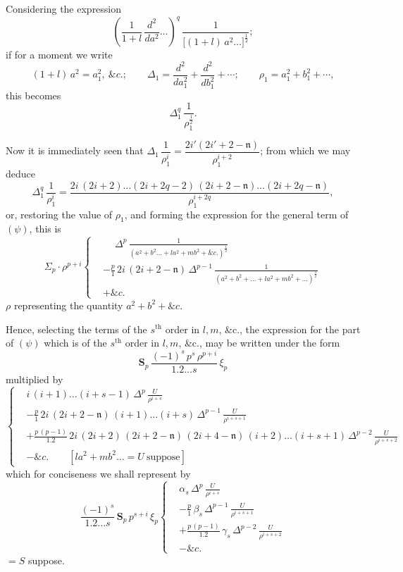 \documentclass[11pt]{article}
\begin{document}
\bigskip

Considering the expression
\[
\left(\frac{1}{1+l}\,\frac{d^2}{da^2}\ldots\right)^{q}\,\frac{1}{\bigl[(1+l)\,a^2 \ldots\bigr]^{\frac{1}{2}}};
\]
if for a moment we write
\[
(1+l)\,a^2 = a_1^2,\ \&c.;\qquad \Delta_1 = \frac{d^2}{da_1^2} + \frac{d^2}{db_1^2} + \cdots;\qquad \rho_1 = a_1^2 + b_1^2 + \cdots,
\]
this becomes
\[
\Delta_1^{q}\,\frac{1}{\rho_1^{\frac{1}{2}}}.
\]

Now it is immediately seen that $\Delta_1\,\dfrac{1}{\rho_1^{i}} = \dfrac{2i'(2i' + 2 - \mathfrak{n})}{\rho_1^{i+2}}$;
from which we may deduce
\[
\Delta_1^{q}\,\frac{1}{\rho_1^{i}} = \frac{2i\,(2i + 2)\ldots(2i + 2q - 2)\,(2i + 2 - \mathfrak{n})\ldots(2i + 2q - \mathfrak{n})}{\rho_1^{i+2q}},
\]
or, restoring the value of $\rho_1$, and forming the expression for the general term of $(\psi)$, this is
\[
\Sigma_{p}\cdot\rho^{p+i}\left\{
\begin{aligned}
&\phantom{-}\Delta^{p}\,\frac{1}{(a^2 + b^2 \ldots + la^2 + mb^2 + \&c.)^{\frac{1}{2}}} \\
&-\frac{p}{1}\,2i\,(2i + 2 - \mathfrak{n})\,\Delta^{p-1}\,\frac{1}{(a^2 + b^2 + \ldots + la^2 + mb^2 + \ldots)^{\frac{3}{2}}} \\
&+ \&c.
\end{aligned}\right.
\]
$\rho$ representing the quantity $a^2 + b^2 + \&c.$

\medskip

Hence, selecting the terms of the $s^{\text{th}}$ order in $l, m$, \&c., the expression for the part of $(\psi)$ which is of the $s^{\text{th}}$ order in $l, m$, \&c., may be written under the form
\[
\boldsymbol{S}_{p}\,\frac{(-1)^{s}\,p^{s}\,\rho^{p+i}}{1.2\ldots s}\,\xi_{p}
\]
multiplied by
\[
\left\{
\begin{aligned}
& i\,(i + 1)\ldots(i + s - 1)\,\Delta^{p}\,\frac{U}{\rho^{i+s}} \\
& -\frac{p}{1}\,2i\,(2i + 2 - \mathfrak{n})\,(i + 1)\ldots(i + s)\,\Delta^{p-1}\,\frac{U}{\rho^{i+s+1}} \\
& + \frac{p\,(p-1)}{1.2}\,2i\,(2i + 2)\,(2i + 2 - \mathfrak{n})\,(2i + 4 - \mathfrak{n})\,(i + 2)\ldots(i + s + 1)\,\Delta^{p-2}\,\frac{U}{\rho^{i+s+2}} \\
& - \&c. \qquad [la^2 + mb^2 \ldots = U\ \text{suppose}]
\end{aligned}\right.
\]
which for conciseness we shall represent by
\[
\frac{(-1)^{s}}{1.2\ldots s}\,\boldsymbol{S}_{p}\,p^{s+i}\,\xi_{p}
\left\{
\begin{aligned}
& \alpha_{s}\,\Delta^{p}\,\frac{U}{\rho^{i+s}} \\
& -\frac{p}{1}\,\beta_{s}\,\Delta^{p-1}\,\frac{U}{\rho^{i+s+1}} \\
& + \frac{p\,(p-1)}{1.2}\,\gamma_{s}\,\Delta^{p-2}\,\frac{U}{\rho^{i+s+2}} \\
& - \&c.
\end{aligned}\right.
\]
$= S$ suppose.
\end{document}
